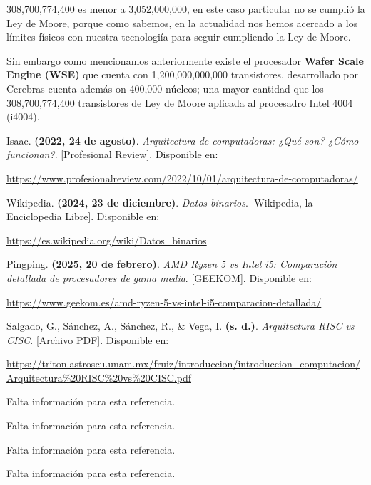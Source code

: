 \documentclass[12pt,letterpaper]{article}
\begin{document}
\begin{enumerate}
  \bigskip
  
  308,700,774,400 es menor a 3,052,000,000, en este caso particular no se cumpli\'{o} la Ley de Moore, porque como sabemos, en la actualidad nos hemos acercado a los l\'{i}mites f\'{i}sicos con nuestra tecnologi\'{i}a para seguir cumpliendo la Ley de Moore.

  Sin embargo como mencionamos anteriormente existe el procesador \textbf{Wafer Scale Engine (WSE)} que cuenta con 1,200,000,000,000 transistores, desarrollado por Cerebras cuenta adem\'{a}s on 400,000 n\'{u}cleos; una mayor cantidad que los 308,700,774,400 transistores de Ley de Moore aplicada al procesadro Intel 4004 (i4004).
  \bigskip
\end{enumerate}

\begin{thebibliography}{9}

  Isaac. \textbf{(2022, 24 de agosto)}. \textit{Arquitectura de computadoras: ¿Qué son? ¿Cómo funcionan?}. [Profesional Review]. Disponible en:

  \url{https://www.profesionalreview.com/2022/10/01/arquitectura-de-computadoras/}
  
  Wikipedia. \textbf{(2024, 23 de diciembre)}. \textit{Datos binarios}. [Wikipedia, la Enciclopedia Libre]. Disponible en:

  \url{https://es.wikipedia.org/wiki/Datos_binarios}

  Pingping. \textbf{(2025, 20 de febrero)}. \textit{AMD Ryzen 5 vs Intel i5: Comparación detallada de procesadores de gama media}. [GEEKOM]. Disponible en:

  \url{https://www.geekom.es/amd-ryzen-5-vs-intel-i5-comparacion-detallada/}

  Salgado, G., Sánchez, A., Sánchez, R., \& Vega, I. \textbf{(s. d.)}. \textit{Arquitectura RISC vs CISC}. [Archivo PDF]. Disponible en:

  \url{https://triton.astroscu.unam.mx/fruiz/introduccion/introduccion_computacion/Arquitectura\%20RISC\%20vs\%20CISC.pdf}

  Falta información para esta referencia.

  Falta información para esta referencia.

  Falta información para esta referencia.

  Falta información para esta referencia.


\end{thebibliography}
\end{document}

